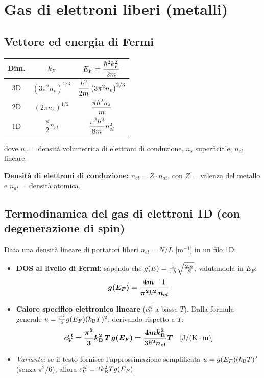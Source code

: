 \newpage
\section{Gas di elettroni liberi (metalli)}

\subsection{Vettore ed energia di Fermi}
\begin{center}
\renewcommand{\arraystretch}{1.8}
\begin{tabular}{c c c}
\toprule
Dim. & $k_F$ & $E_F = \dfrac{\hbar^2k_F^2}{2m}$ \\
\midrule
3D & $\left(3\pi^2 n_v\right)^{1/3}$ & $\dfrac{\hbar^2}{2m}\left(3\pi^2n_v\right)^{2/3}$ \\
2D & $\left(2\pi n_s\right)^{1/2}$ & $\dfrac{\pi\hbar^2 n_s}{m}$ \\
1D & $\dfrac{\pi}{2}n_{el}$ & $\dfrac{\pi^2\hbar^2}{8m}n_{el}^2$ \\
\bottomrule
\end{tabular}
\end{center}
dove $n_v$ = densità volumetrica di elettroni di conduzione, $n_s$ superficiale, $n_{el}$ lineare.

\textbf{Densità di elettroni di conduzione:} $n_{el} = Z\cdot n_{at}$, con $Z$ = valenza del metallo e $n_{at}$ = densità atomica.

\subsection{Termodinamica del gas di elettroni 1D (con degenerazione di spin)}
Data una densità lineare di portatori liberi $n_{el}=N/L$ [m$^{-1}$] in un filo 1D:
\begin{itemize}
    \setlength{\itemsep}{1pt}
    \item \textbf{DOS al livello di Fermi:} sapendo che $g(E)=\frac{1}{\pi\hbar}\sqrt{\frac{2m}{E}}$, valutandola in $E_F$:
    \[ \bm{g(E_F) = \frac{4m}{\pi^2\hbar^2}\frac{1}{n_{el}}} \]
    \item \textbf{Calore specifico elettronico lineare} ($c_V^{el}$ a basse $T$). Dalla formula generale $u=\frac{\pi^2}{6}g(E_F)(k_{\mathrm{B}} T)^2$, derivando rispetto a $T$:
    \[ \bm{c_V^{el} = \frac{\pi^2}{3}k_{\mathrm{B}}^2\,T\,g(E_F) = \frac{4mk_{\mathrm{B}}^2}{3\hbar^2 n_{el}}T} \quad [\text{J}/(\text{K}\cdot\text{m})] \]
    \item \textit{Variante:} se il testo fornisce l'approssimazione semplificata $u = g(E_F)(k_{\mathrm{B}} T)^2$ (senza $\pi^2/6$), allora $c_V^{el}=2k_{\mathrm{B}}^2Tg(E_F)$
\end{itemize}

